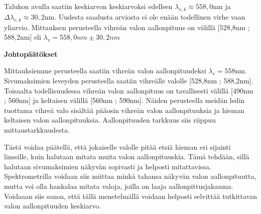 \documentclass[11pt,a4paper]{article}
\begin{document}
\vspace{0.2cm}

\noindent Talukon avulla saatiin keskiarvon keskiarvoksi edelleen ${\lambda}_{v,k} \approx 558,0$nm ja $\Delta {\lambda}_{v,k} \approx 30,2$nm. Uudesta saadusta arviosta ei ole enään todellinen virhe vaan yliarvio. Mittauksen perusteella vihreän valon aallonpituus on välillä [528,8nm ; 588,2nm] eli ${\lambda}_v = 558,0nm \pm 30,2nm$

\pagebreak

\noindent\Large\textbf{Johtopäätökset}

\noindent Mittauksiemme perusteella saatiin vihreän valon aallonpituudeksi ${\lambda}_v =558$nm. Sivumaksimien leveyden perusteella saatiin vihreälle valolle [528,8nm ; 588,2nm]. Toisaalta todellisuudessa vihreän valon aallonpituus on tavallisesti välillä [490nm ; 560nm] ja keltaisen välillä [560nm ; 590nm]. Näiden perusteella meidän ledin tuottama vihreä valo sisältää pääosin vihreän valon aallonpituuksia ja hieman keltaisen valon aallonpituuksia. Aallonpituuden tarkkuus siis riippuu mittaustarkkuudesta. 

Tästä voidaa päätellä, että jokaiselle valolle pitää etsiä hieman eri sijainti linssille, kuin halutaan mitata muita valon aallonpituuskia. Tämä tehdään, sillä halutaan sivumaksimien näkyvän sopivasti ja helposti mitattavissa. Spektrometrilla voidaan siis miittaa minkä tahansa näkyvän valon aallonpituutta, mutta voi olla hankalaa mitata valoja, joilla on laaja aallonpittusjakauma. Voidaaan siis sanoa, että tällä menetelmällä voidaan helposti selvittää tutkittavan valon aallonpituuden keskiarvo.
\end{document}
